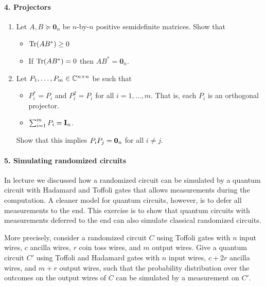 \paragraph*{4. Projectors} 
\begin{enumerate}
\item Let $A,B \succeq \mathbf{0}_n$ be $n$-by-$n$ positive semidefinite matrices.  Show that 
\begin{itemize}
  \item $\mathrm{Tr}(AB^*) \ge 0$  
  \item If $\mathrm{Tr}(AB^*) = 0$ then $AB^* = \mathbf{0}_n$.
\end{itemize}
\item Let $P_1, \ldots, P_m \in \mathbb{C}^{n \times n}$ be such that 
\begin{itemize}
  \item $P_i^* = P_i$ and $P_i^2 = P_i$ for all $i =1, \ldots, m$.  That is, each $P_i$ is an orthogonal projector.
  \item $\sum_{i=1}^m P_i = \mathbf{I}_n$.
\end{itemize}
Show that this implies $P_i P_j = \mathbf{0}_n$ for all $i \ne j$.  
\end{enumerate}

\paragraph*{5. Simulating randomized circuits}
In lecture we discussed how a randomized circuit can be simulated by a quantum circuit with Hadamard and Toffoli gates 
that allows measurements during the computation.  A cleaner model for quantum circuits, however, is to defer all measurements to the end.  
This exercise is to show that quantum circuits with measurements deferred to the end can also simulate classical randomized circuits.

More precisely, consider a randomized circuit $C$ using Toffoli gates with $n$ input wires, $c$ ancilla wires, $r$ coin toss wires, and $m$ output wires.  
Give a quantum circuit $C'$ using Toffoli and Hadamard gates with $n$ input wires, $c+2r$ ancilla wires, and $m+r$ output wires, such that the probability
distribution over the outcomes on the output wires of $C$ can be simulated by a measurement on $C'$.


